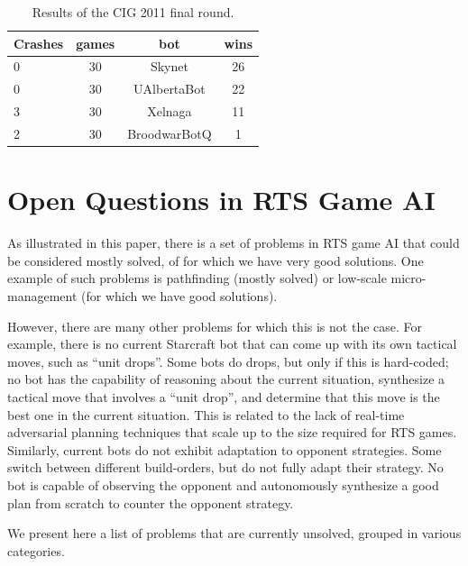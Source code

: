 \documentclass[journal]{IEEEtran}
\begin{document}
\begin{table}[bth]
\caption{Results of the CIG 2011 final round.}
\label{tab:cig-final-round}
\begin{small}
\begin{center}
\begin{tabular}{|l|c|c|c|}
\hline
Crashes & games & bot	& wins\\ \hline
0 &  30 &	 Skynet	  		&  26\\
0 &	 30 &	 UAlbertaBot 	&  22\\
3 &	 30 &	 Xelnaga  		&  11\\
2 &	 30 &	 BroodwarBotQ  	&  1\\
\hline
\end{tabular}
\end{center}
\end{small}
\end{table}



\section{Open Questions in RTS Game AI}\label{sec:questions}

As illustrated in this paper, there is a set of problems in RTS game AI that could be considered mostly solved, of for which we have very good solutions. One example of such problems is pathfinding (mostly solved) or low-scale micro-management (for which we have good solutions). 

However, there are many other problems for which this is not the case. For example, there is no current Starcraft bot that can come up with its own tactical moves, such as ``unit drops''. Some bots do drops, but only if this is hard-coded; no bot has the capability of reasoning about the current situation, synthesize a tactical move that involves a ``unit drop'', and determine that this move is the best one in the current situation. This is related to the lack of real-time adversarial planning techniques that scale up to the size required for RTS games. Similarly, current bots do not exhibit adaptation to opponent strategies. Some switch between different build-orders, but do not fully adapt their strategy. No bot is capable of observing the opponent and autonomously synthesize a good plan from scratch to counter the opponent strategy.

We present here a list of problems that are currently unsolved, grouped in various categories.
\end{document}

